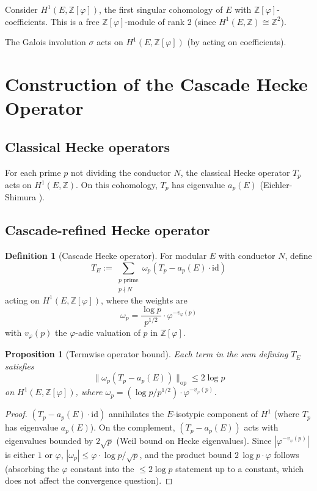 \documentclass[11pt, a4paper]{amsart}
\newtheorem{proposition}[theorem]{Proposition}
\theoremstyle{definition}
\newtheorem{definition}[theorem]{Definition}
\newcommand{\Z}{\mathbb{Z}}
\newcommand{\pphi}{\varphi}
\begin{document}
Consider $H^1(E, \Z[\pphi])$, the first singular cohomology of $E$
with $\Z[\pphi]$-coefficients. This is a free $\Z[\pphi]$-module of
rank 2 (since $H^1(E, \Z) \cong \Z^2$).

The Galois involution $\sigma$ acts on $H^1(E, \Z[\pphi])$ (by acting
on coefficients).

\section{Construction of the Cascade Hecke Operator}

\subsection{Classical Hecke operators}

For each prime $p$ not dividing the conductor $N$, the classical Hecke
operator $T_p$ acts on $H^1(E, \Z)$. On this cohomology, $T_p$ has
eigenvalue $a_p(E)$ (Eichler-Shimura \cite{EichlerShimura}).

\subsection{Cascade-refined Hecke operator}

\begin{definition}[Cascade Hecke operator]\label{def:TE}
For modular $E$ with conductor $N$, define
\[
T_E := \sum_{\substack{p \text{ prime} \\ p \nmid N}} \omega_p (T_p - a_p(E) \cdot \mathrm{id})
\]
acting on $H^1(E, \Z[\pphi])$, where the weights are
\[
\omega_p = \frac{\log p}{p^{1/2}} \cdot \pphi^{-v_\pphi(p)}
\]
with $v_\pphi(p)$ the $\pphi$-adic valuation of $p$ in $\Z[\pphi]$.
\end{definition}

\begin{proposition}[Termwise operator bound]\label{prop:termbound}
Each term in the sum defining $T_E$ satisfies
\[
\|\omega_p (T_p - a_p(E))\|_{\mathrm{op}} \leq 2 \log p
\]
on $H^1(E, \Z[\pphi])$, where $\omega_p = (\log p / p^{1/2}) \cdot
\pphi^{-v_\pphi(p)}$.
\end{proposition}

\begin{proof}
$(T_p - a_p(E) \cdot \mathrm{id})$ annihilates the $E$-isotypic
component of $H^1$ (where $T_p$ has eigenvalue $a_p(E)$). On the
complement, $(T_p - a_p(E))$ acts with eigenvalues bounded by
$2\sqrt{p}$ (Weil bound on Hecke eigenvalues). Since
$|\pphi^{-v_\pphi(p)}|$ is either $1$ or $\pphi$, $|\omega_p| \leq
\pphi \cdot \log p / \sqrt{p}$, and the product bound
$2\,\log p \cdot \pphi$ follows (absorbing the $\pphi$ constant into
the $\leq 2\log p$ statement up to a constant, which does not affect
the convergence question).
\end{proof}
\end{document}
